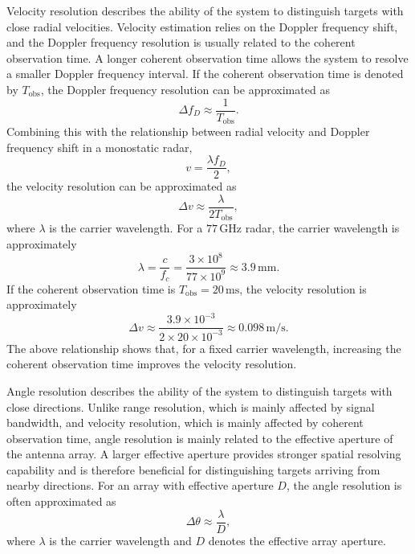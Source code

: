 Velocity resolution describes the ability of the system to distinguish targets
with close radial velocities.
Velocity estimation relies on the Doppler frequency shift, and the Doppler
frequency resolution is usually related to the coherent observation time.
A longer coherent observation time allows the system to resolve a smaller
Doppler frequency interval.
If the coherent observation time is denoted by \(T_{\mathrm{obs}}\), the
Doppler frequency resolution can be approximated as
\begin{equation}
    \Delta f_D \approx \frac{1}{T_{\mathrm{obs}}}.
    \label{eq:doppler_frequency_resolution}
\end{equation}
Combining this with the relationship between radial velocity and Doppler
frequency shift in a monostatic radar,
\begin{equation}
    v=\frac{\lambda f_D}{2},
    \label{eq:velocity_doppler_resolution}
\end{equation}
the velocity resolution can be approximated as
\begin{equation}
    \Delta v \approx \frac{\lambda}{2T_{\mathrm{obs}}},
    \label{eq:velocity_resolution}
\end{equation}
where \(\lambda\) is the carrier wavelength.
For a \(77\,\mathrm{GHz}\) radar, the carrier wavelength is approximately
\begin{equation}
    \lambda=\frac{c}{f_c}
    =
    \frac{3\times10^8}{77\times10^9}
    \approx 3.9\,\mathrm{mm}.
    \label{eq:wavelength_77ghz}
\end{equation}
If the coherent observation time is \(T_{\mathrm{obs}}=20\,\mathrm{ms}\), the
velocity resolution is approximately
\begin{equation}
    \Delta v
    \approx
    \frac{3.9\times10^{-3}}{2\times20\times10^{-3}}
    \approx
    0.098\,\mathrm{m/s}.
    \label{eq:velocity_resolution_example}
\end{equation}
The above relationship shows that, for a fixed carrier wavelength, increasing
the coherent observation time improves the velocity resolution.

Angle resolution describes the ability of the system to distinguish targets
with close directions.
Unlike range resolution, which is mainly affected by signal bandwidth, and
velocity resolution, which is mainly affected by coherent observation time,
angle resolution is mainly related to the effective aperture of the antenna
array.
A larger effective aperture provides stronger spatial resolving capability and
is therefore beneficial for distinguishing targets arriving from nearby
directions.
For an array with effective aperture \(D\), the angle resolution is often
approximated as
\begin{equation}
    \Delta \theta \approx \frac{\lambda}{D},
    \label{eq:angle_resolution}
\end{equation}
where \(\lambda\) is the carrier wavelength and \(D\) denotes the effective
array aperture.

